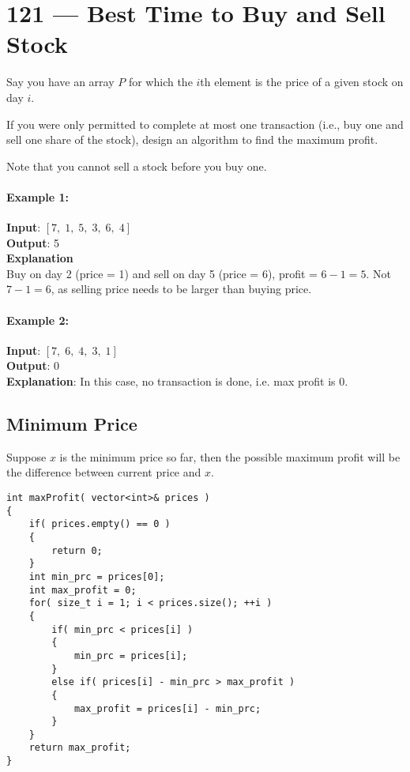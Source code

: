 \section{121 --- Best Time to Buy and Sell Stock}
Say you have an array $P$ for which the $i$th element is the price of a given stock on day $i$.
\par
If you were only permitted to complete at most one transaction (i.e., buy one and sell one share of the stock), design an algorithm to find the maximum profit.
\par
Note that you cannot sell a stock before you buy one.
\paragraph{Example 1:}
\begin{flushleft}
\textbf{Input}: $[7,\;1,\;5,\;3,\;6,\;4]$
\\
\textbf{Output}: 5
\\
\textbf{Explanation}
\\
Buy on day 2 (price = 1) and sell on day 5 (price = 6), profit = $6-1 = 5$. Not $7-1 = 6$, as selling price needs to be larger than buying price.
\end{flushleft}
\paragraph{Example 2:}
\begin{flushleft}
\textbf{Input}: $[7,\;6,\;4,\;3,\;1]$
\\
\textbf{Output}: 0
\\
\textbf{Explanation}: In this case, no transaction is done, i.e. max profit is 0.
\end{flushleft}
\subsection{Minimum Price}

Suppose $x$ is the minimum price so far, then the possible maximum profit will be the difference between current price and $x$.

\setcounter{lstlisting}{0}
\begin{lstlisting}[style=customc, caption={One Pass}]
int maxProfit( vector<int>& prices )
{
    if( prices.empty() == 0 )
    {
        return 0;
    }
    int min_prc = prices[0];
    int max_profit = 0;
    for( size_t i = 1; i < prices.size(); ++i )
    {
        if( min_prc < prices[i] )
        {
            min_prc = prices[i];
        }
        else if( prices[i] - min_prc > max_profit )
        {
            max_profit = prices[i] - min_prc;
        }
    }
    return max_profit;
}
\end{lstlisting}

